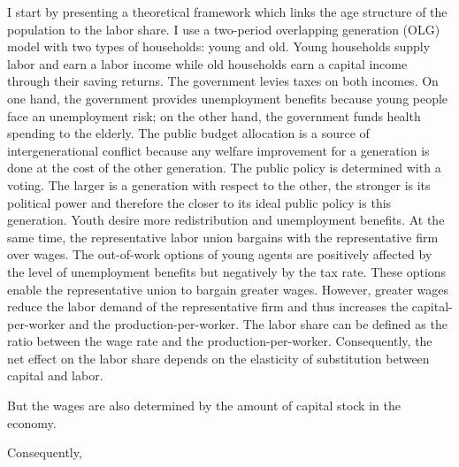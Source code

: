 I start by presenting a theoretical framework which links the age structure of the population to the labor share. I use a two-period overlapping generation (OLG) model with two types of households: young and old. Young households supply labor and earn a labor income while old households earn a capital income through their saving returns.
The government levies taxes on both incomes. On one hand, the government provides unemployment benefits because young people face an unemployment risk; on the other hand, the government funds health spending to the elderly. The public budget allocation is a source of intergenerational conflict because any welfare improvement for a generation is done at the cost of the other generation. The public policy is determined with a voting. The larger is a generation with respect to the other, the stronger is its political power and therefore the closer to its ideal public policy is this generation. Youth desire more redistribution and unemployment benefits.
At the same time, the representative labor union bargains with the representative firm over wages. The out-of-work options of young agents are positively affected by the level of unemployment benefits but negatively by the tax rate. These options enable the representative union to bargain greater wages. However, greater wages reduce the labor demand of the representative firm and thus increases the capital-per-worker and the production-per-worker. The labor share can be defined as the ratio between the wage rate and the production-per-worker. Consequently, the net effect on the labor share depends on the elasticity of substitution between capital and labor.



But the wages are also determined by the amount of capital stock in the economy.


Consequently, 




